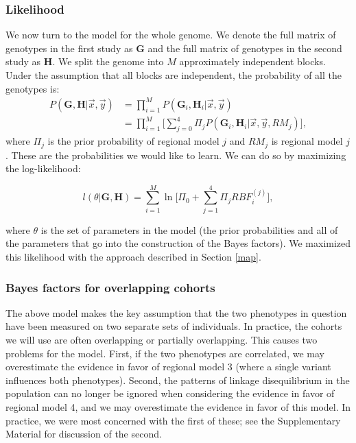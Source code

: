 \documentclass[11pt,titlepage]{article}
\begin{document}
\subsubsection{Likelihood}
We now turn to the model for the whole genome. We denote the full matrix of genotypes in the first study as $\mathbf{G}$ and the full matrix of genotypes in the second study as $\mathbf{H}$. We split the genome into $M$ approximately independent blocks. Under the assumption that all blocks are independent, the probability of all the genotypes is:
\begin{align}
P(\mathbf{G}, \mathbf{H} | \vec x, \vec y) &= \prod \limits_{i = 1}^M P(\mathbf{G}_i, \mathbf{H}_i | \vec x, \vec y)\\
 &=  \prod \limits_{i = 1}^M \bigg[ \sum \limits_{j = 0}^4 \Pi_j P(\mathbf{G}_i, \mathbf{H}_i  | \vec x, \vec y, RM_j) \bigg],
\end{align} 
\noindent where $\Pi_j$ is the prior probability of regional model $j$ and $RM_j$ is regional model $j$. These are the probabilities we would like to learn. We can do so by maximizing the log-likelihood:

\begin{equation} \label{loglik}
l(\theta | \mathbf{G}, \mathbf{H}) = \sum \limits_{i = 1}^M \ln \bigg[ \Pi_0 + \sum \limits_{j = 1}^4 \Pi_j RBF_i^{(j)} \bigg],
\end{equation}

\noindent where $\theta$ is the set of parameters in the model (the prior probabilities and all of the parameters that go into the construction of the Bayes factors). We maximized this likelihood with the approach described in Section \ref{map}. 

\subsubsection{Bayes factors for overlapping cohorts}
The above model makes the key assumption that the two phenotypes in question have been measured on two separate sets of individuals. In practice, the cohorts we will use are often overlapping or partially overlapping. This causes two problems for the model. First, if the two phenotypes are correlated, we may overestimate the evidence in favor of regional model 3 (where a single variant influences both phenotypes). Second, the patterns of linkage disequilibrium in the population can no longer be ignored when considering the evidence in favor of regional model 4, and we may overestimate the evidence in favor of this model. In practice, we were most concerned with the first of these; see the Supplementary Material for discussion of the second. 
\end{document}
